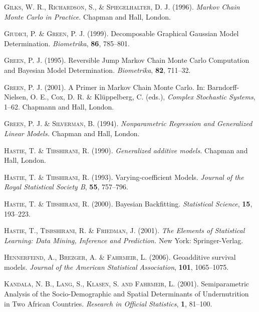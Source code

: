 \begin{thebibliography}{99}
 {\scshape Gilks, W. R., Richardson, S., \& Spiegelhalter, D. J.} (1996).
 {\it Markov Chain Monte Carlo in Practice.}
 Chapman and Hall, London.

 {\scshape Giudici, P. \& Green, P. J.} (1999).
 Decomposable Graphical Gaussian Model Determination.
 {\it Biometrika}, {\bf 86}, 785--801.

 {\scshape Green, P. J.} (1995).
 Reversible Jump Markov Chain Monte Carlo Computation and Bayesian Model Determination.
 {\it Biometrika}, {\bf  82}, 711--32.

 {\scshape Green, P. J.} (2001).
 A Primer in Markov Chain Monte Carlo.
 In: Barndorff-Nielsen, O. E., Cox, D. R. \& Kl\"{u}ppelberg, C. (eds.),
 {\it Complex Stochastic Systems}, 1--62.
 Chapmann and Hall, London.

 {\scshape Green, P. J. \& Silverman, B.} (1994).
 {\it Nonparametric Regression and Generalized Linear Models.}
 Chapman and Hall, London.

 {\scshape Hastie, T. \& Tibshirani, R.} (1990).
 {\it Generalized additive models.}
 Chapman and Hall, London.

 {\scshape Hastie, T. \& Tibshirani, R.} (1993).
 Varying-coefficient Models.
 {\it Journal of the Royal Statistical Society B}, {\bf 55}, 757--796.

 {\scshape Hastie, T. \& Tibshirani, R.} (2000).
 Bayesian Backfitting.
 {\it Statistical Science}, {\bf 15}, 193--223.

 {\scshape Hastie, T., Tisbshirani, R. \& Friedman, J.} (2001).
 {\it The Elements of Statistical Learning: Data Mining, Inference and Prediction.}
 New York: Springer-Verlag.

 {\scshape Hennerfeind, A., Brezger, A. \& Fahrmeir, L.} (2006).
 Geoadditive survival models.
 {\it Journal of the American Statistical Association}, {\bf 101}, 1065--1075.

 {\scshape Kandala, N. B., Lang, S., Klasen, S. and Fahrmeir, L.} (2001).
 Semiparametric Analysis of the Socio-Demographic and Spatial Determinants of Undernutrition in Two African Countries.
 {\it Research in Official Statistics}, {\bf 1}, 81--100.


\end{thebibliography}
